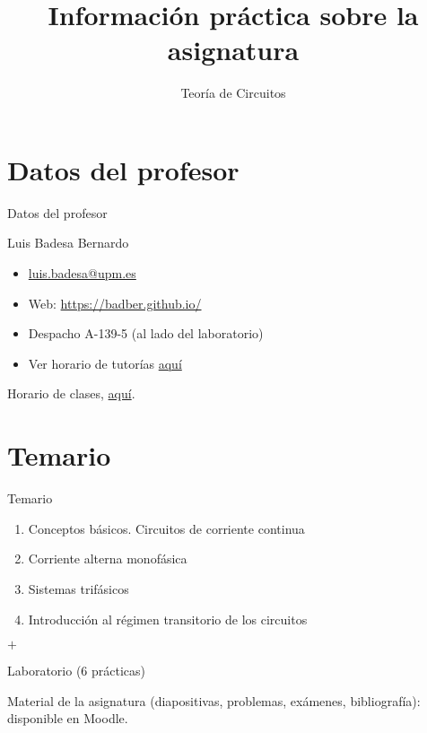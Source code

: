 \documentclass[aspectratio=169, usenames,svgnames,dvipsnames]{beamer}
\date{}
\title{\LARGE Información práctica sobre la asignatura \vspace{5mm}}
\subtitle{Teoría de Circuitos}
\begin{document}
\maketitle

\section*{Datos del profesor}

\begin{frame}{Datos del profesor}
    
    Luis Badesa Bernardo
        \begin{itemize}
        \item \href{mailto:luis.badesa@upm.es}{luis.badesa@upm.es}
        \item Web: \url{https://badber.github.io/}
        \item Despacho A-139-5 (al lado del laboratorio)
        \item Ver horario de tutorías 
        \href{http://programas.etsidi.upm.es/SOA/tutorias/}{aquí}            
    \end{itemize}
    \vspace{6mm}
    Horario de clases, \href{https://www.etsidi.upm.es/Estudiantes/AgendaAcademica/AAHorarioClases}{aquí}.
    

\end{frame}


\section*{Temario}

\begin{frame}{Temario}
    \begin{enumerate}
        \item Conceptos básicos. Circuitos de corriente continua
        \item Corriente alterna monofásica
        \item Sistemas trifásicos
        \item Introducción al régimen transitorio de los circuitos
    \end{enumerate}
    \hspace{7mm} $+$
    
    \hspace{7mm} Laboratorio (6 prácticas)

    \vspace{7mm}

    \hspace{7mm} \alert{Material de la asignatura} (diapositivas, problemas, exámenes, bibliografía): 
    \vspace{1mm}
    \hspace{7mm} disponible en Moodle.

\end{frame}
\end{document}
